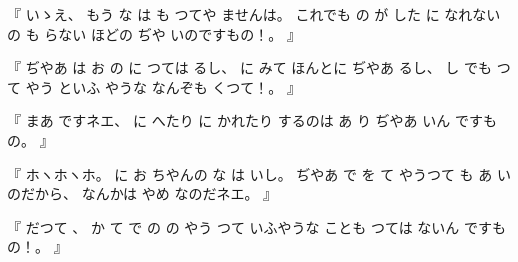 %
『
いゝえ、
%
もう
な
は
も
つてや
ませんは。
%
これでも
の%
が
した
に
なれない
の
も
らない
ほどの
ぢや
いのですもの！。
』

%
『
ぢやあ
は
お
の
に
つては
るし、
%
に
みて
ほんとに
ぢやあ
るし、
%
し
でも
つて
やう
といふ
やうな
なんぞも
くつて！。
』

%
『
まあ
ですネエ、
%
に
へたり
に
かれたり
するのは
あ
り
ぢやあ
いん
ですもの。
』

%
『
ホヽホヽホ。
%
に
お
ちやんの
な
は
いし。
%
ぢやあ
で
を
て
やうつて
も
あ
い
のだから、
%
なんかは
やめ
なのだネエ。
』

%
『
だつて
、
%
か
て
で
の
の
やう
つて
いふやうな
ことも
つては
ないん
ですもの！。
』
